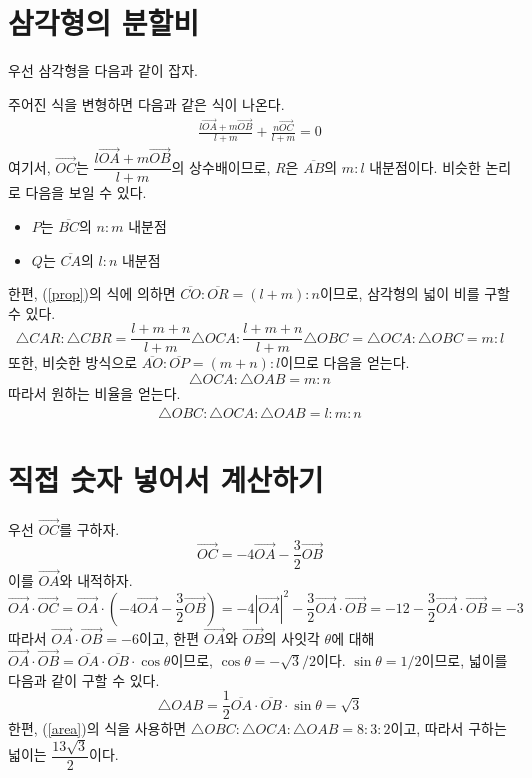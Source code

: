 \documentclass{scrartcl}
\title{\doctitle}
\author{Project Eclipse (손량)}
\date{Last compiled on: \today, \currenttime}
\newcommand{\Seg}[1]{\overline{#1}}
\newcommand{\Ray}[1]{\overrightarrow{#1}}
\begin{document}
\maketitle

\section{삼각형의 분할비}
우선 삼각형을 다음과 같이 잡자.
\begin{figure}[H]
\centering

\end{figure}
주어진 식을 변형하면 다음과 같은 식이 나온다.
\begin{align}\label{prop}\frac{l\Ray{OA}+m\Ray{OB}}{l+m}+\frac{n\Ray{OC}}{l+m}=0\end{align}
여기서, \(\Ray{OC}\)는 \(\dfrac{l\Ray{OA}+m\Ray{OB}}{l+m}\)의 상수배이므로, \(R\)은 \(\Seg{AB}\)의 \(m:l\) 내분점이다. 비슷한 논리로 다음을 보일 수 있다.
\begin{itemize}
 \item \(P\)는 \(\Seg{BC}\)의 \(n:m\) 내분점
 \item \(Q\)는 \(\Seg{CA}\)의 \(l:n\) 내분점
\end{itemize}
한편, (\ref{prop})의 식에 의하면 \(\Seg{CO}:\Seg{OR}=(l+m):n\)이므로, 삼각형의 넓이 비를 구할 수 있다.
\[\triangle CAR:\triangle CBR=\frac{l+m+n}{l+m}\triangle OCA:\frac{l+m+n}{l+m}\triangle OBC=\triangle OCA:\triangle OBC=m:l\]
또한, 비슷한 방식으로 \(\Seg{AO}:\Seg{OP}=(m+n):l\)이므로 다음을 얻는다.
\[\triangle OCA:\triangle OAB=m:n\]
따라서 원하는 비율을 얻는다.
\begin{align}\label{area}\triangle OBC:\triangle OCA:\triangle OAB=l:m:n\end{align}

\section{직접 숫자 넣어서 계산하기}
우선 \(\Ray{OC}\)를 구하자.
\[\Ray{OC}=-4\Ray{OA}-\frac{3}{2}\Ray{OB}\]
이를 \(\Ray{OA}\)와 내적하자.
\[\Ray{OA}\cdot\Ray{OC}=\Ray{OA}\cdot\left( -4\Ray{OA}-\frac{3}{2}\Ray{OB} \right)=-4\left|\Ray{OA}\right|^2-\frac{3}{2}\Ray{OA}\cdot\Ray{OB}=-12-\frac{3}{2}\Ray{OA}\cdot\Ray{OB}=-3\]
따라서 \(\Ray{OA}\cdot\Ray{OB}=-6\)이고, 한편 \(\Ray{OA}\)와 \(\Ray{OB}\)의 사잇각 \(\theta\)에 대해 \(\Ray{OA}\cdot\Ray{OB}=\Seg{OA}\cdot\Seg{OB}\cdot\cos\theta\)이므로, \(\cos\theta=-\sqrt{3}/2\)이다. \(\sin\theta=1/2\)이므로, 넓이를 다음과 같이 구할 수 있다.
\[\triangle OAB=\frac{1}{2}\Seg{OA}\cdot\Seg{OB}\cdot\sin\theta=\sqrt{3}\]
한편, (\ref{area})의 식을 사용하면 \(\triangle OBC:\triangle OCA:\triangle OAB=8:3:2\)이고, 따라서 구하는 넓이는 \(\dfrac{13\sqrt{3}}{2}\)이다.
\end{document}
